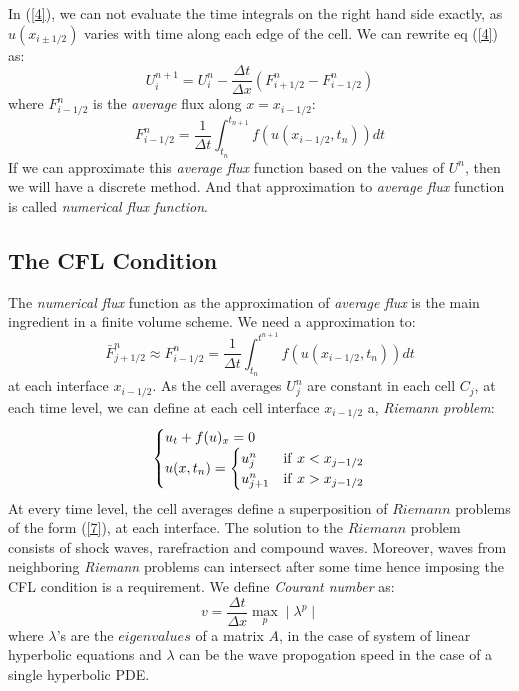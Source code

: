 In (\ref{4}), we can not evaluate the time integrals on the right hand side exactly, as $u(x_{i\pm1/2})$ varies with time along each edge of the cell. We can rewrite eq (\ref{4}) as:
\begin{equation}
U_i^{n+1} = U_i^n - \frac{\Delta t}{\Delta x} \left(F_{i+1/2}^n - F_{i-1/2}^n \right)
\end{equation}
where $F_{i-1/2}^n $ is the \textit{average} flux along $ x = x_{i-1/2}$:
\begin{equation*}
F_{i-1/2}^n  =  \frac{1}{\Delta t} \int_{t_n}^{t_{n+1}} f(u(x_{i-1/2},t_n)) dt
\end{equation*}
If we can approximate this \textit{average flux} function based on the values of $U^n$, then we will have a discrete method. And that approximation to \textit{average flux}  function is called \textit{numerical flux function}.

\subsection{The CFL Condition}
The \textit{numerical flux} function as the approximation of \textit{average flux} is the main ingredient in a finite volume scheme. We need a approximation to:
\begin{equation}
\bar{F}^n_{j+1/2} \approx F^n_{i-1/2} =  \frac{1}{\Delta t}\int_{t_n}^{t^{n+1}} f(u(x_{i-1/2}, t_n)) dt
\end{equation}
at each interface $x_{i-1/2}$. As the cell averages $U^n_j$ are constant in each cell $C_j$, at each time level, we can define at each cell interface $x_{i-1/2}$ a, \textit{Riemann problem}:
\begin{equation} \label{7}
\begin{cases}
u_t + f(u)_x = 0 \\
u(x, t_n) = & \hspace{-28pt}
\begin{cases}
u^n_j  &  \text{if} \hspace{4pt} x < x_{j-1/2} \\
u^n_{j+1} & \text{if} \hspace{4pt} x > x_{j-1/2}
\end{cases}
\end{cases}
\end{equation}
At every time level, the cell averages define a superposition of $Riemann$ problems of the form (\ref{7}), at each interface. The solution to the $Riemann$ problem consists of shock waves, rarefraction and compound waves. Moreover, waves from neighboring \textit{Riemann} problems can intersect after some time hence imposing the CFL condition is a requirement. We define \textit{Courant number} as:
\begin{equation} \label{8}
v = \frac{\Delta t}{\Delta x} \max_p\mid\lambda^p\mid
\end{equation}
where $\lambda$'s are the $eigenvalues$ of a matrix $A$, in the case of system of linear hyperbolic equations and $\lambda$ can be the wave propogation speed in the case of a single hyperbolic PDE.

